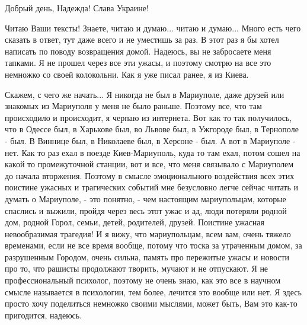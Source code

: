  
 
 
 
 

Добрый день, Надежда! Слава Украине!

Читаю Ваши тексты! Знаете, читаю и думаю... читаю и думаю...  Много есть чего
сказать в ответ, тут даже всего и не уместишь за раз.  В этот раз я бы хотел
написать по поводу возвращения домой.  Надеюсь, вы не забросаете меня тапками.
Я не прошел через все эти ужасы, и поэтому смотрю на все это немножко со своей
колокольни. Как я уже писал ранее, я из Киева.

Скажем, с чего же начать... Я никогда не был в Мариуполе, даже друзей или
знакомых из Мариуполя у меня не было раньше. Поэтому все, что там происходило и
происходит, я черпаю из интернета.  Вот как то так получилось, что в Одессе
был, в Харькове был, во Львове был, в Ужгороде был, в Тернополе - был. В
Виннице был, в Николаеве был, в Херсоне - был. А вот в Мариуполе - нет. Как то
раз ехал в поезде Киев-Мариуполь, куда то там ехал, потом сошел на какой то
промежуточной станции, вот и все, что меня связывало с Мариуполем до начала
вторжения. Поэтому в смысле эмоционального воздействия всех этих поистине
ужасных и трагических событий мне безусловно легче сейчас читать и думать о
Мариуполе, - это понятно, - чем настоящим мариупольцам, которые спаслись и
выжили, пройдя через весь этот ужас и ад, люди потеряли родной дом, родной
Горол, семьи, детей, родителей, друзей. Поистине ужасная невообразимая
трагедия! И я вижу, что мариупольцам, всем вам, очень тяжело временами, если не
все время вообще, потому что тоска за утраченным домом, за разрушенным Городом,
очень сильна, память про пережитые ужасы и новости про то, что рашисты
продолжают творить, мучают и не отпускают.  Я не профессиональный психолог,
поэтому не очень знаю, как это все в научном смысле называется в психологии,
тем более, лечится это вообще или нет. Я здесь просто хочу поделиться немножко
своими мыслями, может быть, Вам это как-то пригодится, надеюсь.

